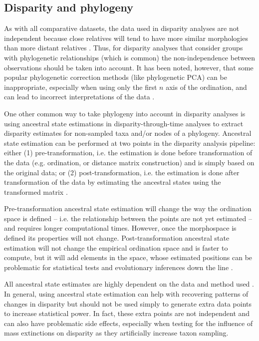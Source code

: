 \documentclass[12pt,letterpaper]{article}
\begin{document}
\subsection{Disparity and phylogeny} \label{section:phylo}

As with all comparative datasets, the data used in disparity analyses are not independent because close relatives will tend to have more similar morphologies than more distant relatives \citep{Harvey1998}.
Thus, for disparity analyses that consider groups with phylogenetic relationships (which is common) the non-independence between observations should be taken into account.
It has been noted, however, that some popular phylogenetic correction methods (like phylogenetic PCA) can be inappropriate, especially when using only the first $n$ axis of the ordination, and can lead to incorrect interpretations of the data \citep[such as wrongly supporting ``early burst'' type patterns;][]{Uyeda2015}.

One other common way to take phylogeny into account in disparity analyses is using ancestral state estimations in disparity-through-time analyses to extract disparity estimates for non-sampled taxa and/or nodes of a phylogeny.
Ancestral state estimation can be performed at two points in the disparity analysis pipeline: either (1) pre-transformation, i.e. the estimation is done before transformation of the data (e.g. ordination, or distance matrix construction) and is simply based on the original data; or (2) post-transformation, i.e. the estimation is done after transformation of the data by estimating the ancestral states using the transformed matrix \citep[e.g. the ordination scores;][]{lloyd2018}.

Pre-transformation ancestral state estimation will change the way the ordination space is defined -- i.e. the relationship between the points are not yet estimated -- and requires longer computational times.
However, once the morphospace is defined its properties will not change.
Post-transformation ancestral state estimation will not change the empirical ordination space and is faster to compute, but it will add elements in the space, whose estimated positions can be problematic for statistical tests and evolutionary inferences down the line \citep{lloyd2018}.

All ancestral state estimates are highly dependent on the data and method used \cite{Louca2019}.
In general, using ancestral state estimation can help with recovering patterns of changes in disparity but should not be used simply to generate extra data points to increase statistical power.
In fact, these extra points are not independent and can also have problematic side effects, especially when testing for the influence of mass extinctions on disparity as they artificially increase taxon sampling.
\end{document}
